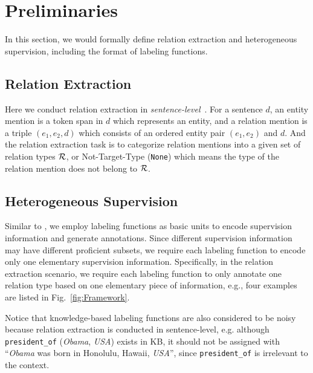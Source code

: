 
\section{Preliminaries}
\label{sect:prelim}

In this section, we would formally define relation extraction and heterogeneous supervision, including the format of labeling functions.

\subsection{Relation Extraction}
\label{subsec:re}
Here we conduct relation extraction in \textit{sentence-level}~\cite{bao2014knowledge}.
For a sentence $d$, an entity mention is a token span in $d$ which represents an entity, and a relation mention is a triple $(e_1, e_2, d)$ which consists of an ordered entity pair $(e_1, e_2)$ and $d$. And the relation extraction task is to categorize relation mentions into a given set of relation types $\mathcal{R}$, or Not-Target-Type (\texttt{None}) which means the type of the relation mention does not belong to $\mathcal{R}$.

\subsection{Heterogeneous Supervision}
\label{subsec:hetersup}
Similar to \cite{ratner2016data}, we employ labeling functions as basic units to encode supervision information and generate annotations. Since different supervision information may have different proficient subsets, we require each labeling function to encode only one elementary supervision information. Specifically, in the relation extraction scenario, we require each labeling function to only annotate one relation type based on one elementary piece of information, e.g., four examples are listed in Fig.~\ref{fig:Framework}.

Notice that knowledge-based labeling functions are also considered to be noisy because relation extraction is conducted in sentence-level, e.g. although \texttt{president\_of} (\emph{Obama}, \emph{USA}) exists in KB, it should not be assigned with ``\emph{Obama} was born in Honolulu, Hawaii, \emph{USA}'', since \texttt{president\_of} is irrelevant to the context.


